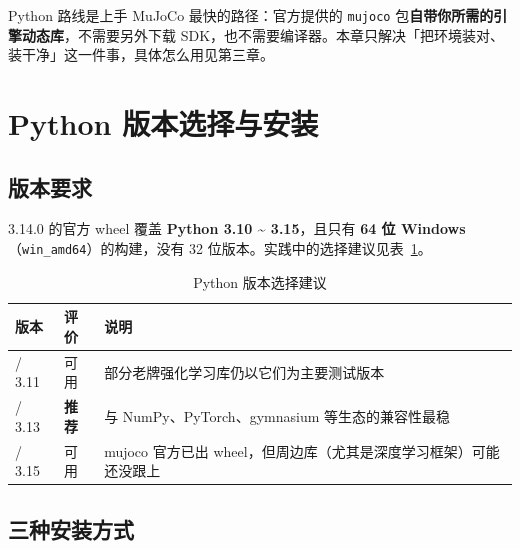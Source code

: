 
Python 路线是上手 MuJoCo 最快的路径：官方提供的 \texttt{mujoco} 包\textbf{自带你所需的引擎动态库}，不需要另外下载 SDK，也不需要编译器。本章只解决「把环境装对、装干净」这一件事，具体怎么用见第三章。

\section{Python 版本选择与安装}

\subsection{版本要求}

\mujoco{} 3.14.0 的官方 wheel 覆盖 \textbf{Python 3.10 \textasciitilde{} 3.15}，且只有 \textbf{64 位 Windows}（\texttt{win\_amd64}）的构建，没有 32 位版本。实践中的选择建议见表~\ref{tab:Python:版本}。

\begin{table}[H]
	\centering
	\caption{Python 版本选择建议}
	\label{tab:Python:版本}
	\footnotesize
	\begin{tabular}{>{\raggedright\arraybackslash}p{2.3cm}>{\raggedright\arraybackslash}p{3.4cm}>{\raggedright\arraybackslash}p{8.4cm}}
		\hline
		版本 & 评价 & 说明 \\
		\hline
		3.10 / 3.11 & 可用 & 部分老牌强化学习库仍以它们为主要测试版本 \\
		3.12 / 3.13 & \textbf{推荐} & 与 NumPy、PyTorch、gymnasium 等生态的兼容性最稳 \\
		3.14 / 3.15 & 可用 & mujoco 官方已出 wheel，但周边库（尤其是深度学习框架）可能还没跟上 \\
		\hline
	\end{tabular}
\end{table}

\subsection{三种安装方式}

